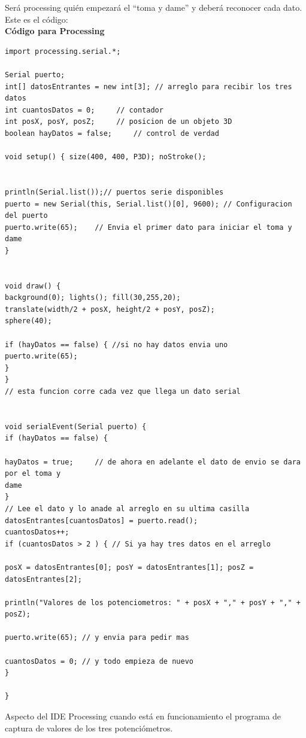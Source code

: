 Será processing quién empezará el “toma y dame” y deberá reconocer cada dato. Este es el código:\\
\textbf{Código para Processing}\\
\begin{lstlisting}
import processing.serial.*;

Serial puerto;
int[] datosEntrantes = new int[3]; // arreglo para recibir los tres datos
int cuantosDatos = 0;     // contador
int posX, posY, posZ;     // posicion de un objeto 3D
boolean hayDatos = false;     // control de verdad

void setup() { size(400, 400, P3D); noStroke();


println(Serial.list());// puertos serie disponibles
puerto = new Serial(this, Serial.list()[0], 9600); // Configuracion del puerto
puerto.write(65);    // Envia el primer dato para iniciar el toma y dame
}


void draw() {
background(0); lights(); fill(30,255,20);
translate(width/2 + posX, height/2 + posY, posZ);
sphere(40);

if (hayDatos == false) { //si no hay datos envia uno
puerto.write(65);
}
}
// esta funcion corre cada vez que llega un dato serial


void serialEvent(Serial puerto) {
if (hayDatos == false) {

hayDatos = true;     // de ahora en adelante el dato de envio se dara por el toma y
dame
}
// Lee el dato y lo anade al arreglo en su ultima casilla
datosEntrantes[cuantosDatos] = puerto.read();
cuantosDatos++;
if (cuantosDatos > 2 ) { // Si ya hay tres datos en el arreglo

posX = datosEntrantes[0]; posY = datosEntrantes[1]; posZ = datosEntrantes[2];

println("Valores de los potenciometros: " + posX + "," + posY + "," + posZ);

puerto.write(65); // y envia para pedir mas

cuantosDatos = 0; // y todo empieza de nuevo
}

}
\end{lstlisting}


Aspecto del IDE Processing cuando está en funcionamiento el programa de captura de valores de los tres potenciómetros.